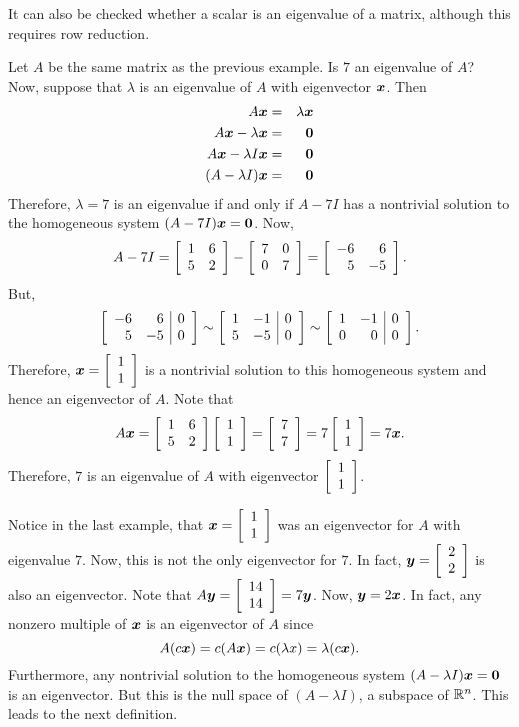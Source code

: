 It can also be checked whether a scalar is an eigenvalue of a matrix, although this requires row reduction.\\

\begin{Exam} Let $A$ be the same matrix as the previous example. Is $7$ an eigenvalue of $A$?\\

Now, suppose that $\lambda$ is an eigenvalue of $A$ with eigenvector $\bb x$. Then 
\begin{eqnarray*}
A\bb x &=& \lambda \bb x\\
A\bb x - \lambda\bb x &=& \bb 0\\
A\bb x - \lambda I\bb x &=& \bb 0\\
(A-\lambda I)\bb x &=& \bb 0
\end{eqnarray*} Therefore, $\lambda = 7$ is an eigenvalue if and only if $A-7I$ has a nontrivial solution to the homogeneous system $(A-7I)\bb x = \bb 0$. Now, 
\[A-7I = \mtx{rr}{1&6\\5&2} - \mtx{rr}{7&0\\0&7} = \mtx{rr}{-6&6\\5&-5}.\] But, 
\[\mtx{rr|r}{-6&6&0\\5&-5&0} \sim \mtx{rr|r}{1&-1&0\\5&-5&0} \sim \mtx{rr|r}{1&-1&0\\0&0&0}.\] Therefore, $\bb x = \vr{1\\1}$ is a nontrivial solution to this homogeneous system and hence an eigenvector of $A$. Note that 
\[A\bb x = \mtx{rr}{1&6\\5&2}\vr{1\\1} = \vr{7\\7} = 7\vr{1\\1} = 7\bb x.\] Therefore, $7$ is an eigenvalue of $A$ with eigenvector $\vr{1\\1}$.
\end{Exam}\vs

Notice in the last example, that $\bb x = \vr{1\\1}$ was an eigenvector for $A$ with eigenvalue $7$. Now, this is not the only eigenvector for $7$. In fact, $\bb y = \vr{2\\2}$ is also an eigenvector. Note that $A\bb y = \vr{14\\14} = 7\bb y$. Now, $\bb y = 2\bb x$. In fact, any nonzero multiple of $\bb x$ is an eigenvector of $A$ since 
\[A(c\bb x) = c(A\bb x) = c(\lambda x) = \lambda(c\bb x).\] Furthermore, any nontrivial solution to the homogeneous system $(A-\lambda I)\bb x  = \bb 0$ is an eigenvector. But this is the null space of $(A-\lambda I)$, a subspace of $\R^n$. This leads to the next definition.\\

